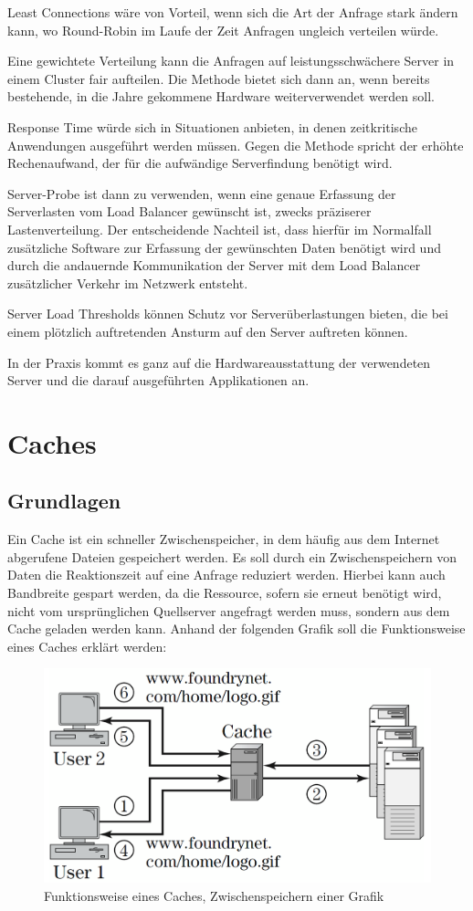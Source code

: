 Least Connections wäre von Vorteil, wenn sich die Art der Anfrage stark ändern kann, wo Round-Robin im Laufe der Zeit Anfragen ungleich verteilen würde.

Eine gewichtete Verteilung kann die Anfragen auf leistungsschwächere Server in einem Cluster fair aufteilen. Die Methode bietet sich dann an, wenn bereits bestehende, in die Jahre gekommene Hardware weiterverwendet werden soll.

Response Time würde sich in Situationen anbieten, in denen zeitkritische Anwendungen ausgeführt werden müssen. Gegen die Methode spricht der erhöhte Rechenaufwand, der für die aufwändige Serverfindung benötigt wird.

Server-Probe ist dann zu verwenden, wenn eine genaue Erfassung der Serverlasten vom Load Balancer gewünscht ist, zwecks präziserer Lastenverteilung. Der entscheidende Nachteil ist, dass hierfür im Normalfall zusätzliche Software zur Erfassung der gewünschten Daten benötigt wird und durch die andauernde Kommunikation der Server mit dem Load Balancer zusätzlicher Verkehr im Netzwerk entsteht.

Server Load Thresholds können Schutz vor Serverüberlastungen bieten, die bei einem plötzlich auftretenden Ansturm auf den Server auftreten können.

In der Praxis kommt es ganz auf die Hardwareausstattung der verwendeten Server und die darauf ausgeführten Applikationen an.


\section{Caches}
\label{sec:Caches}

\subsection{Grundlagen}
\label{sec:Grundlagen}
Ein Cache ist ein schneller Zwischenspeicher, in dem häufig aus dem Internet abgerufene Dateien gespeichert werden. Es soll durch ein Zwischenspeichern von Daten die Reaktionszeit auf eine Anfrage reduziert werden. Hierbei kann auch Bandbreite gespart werden, da die Ressource, sofern sie erneut benötigt wird, nicht vom ursprünglichen Quellserver angefragt werden muss, sondern aus dem Cache geladen werden kann.
Anhand der folgenden Grafik soll die Funktionsweise eines Caches erklärt werden:

\begin{figure}[!ht]
	\begin{center}
		\includegraphics[width=0.5\linewidth]{images/Cache_Funktionsweise.png}
		\caption{Funktionsweise eines Caches, Zwischenspeichern einer Grafik \cite{LoadBalancing2}}
		\label{Cache_Funktionsweise}
	\end{center}
\end{figure}

